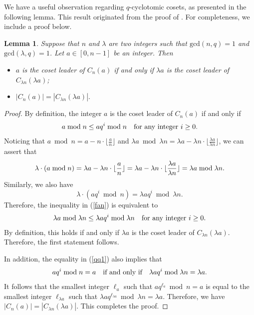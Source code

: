 \documentclass[journal,onecolumn]{IEEEtran}
\newtheorem{lemma}{Lemma}
\begin{document}
We have a useful observation regarding 
$q$-cyclotomic cosets, as presented in the following lemma. This result originated  from  the proof of \cite[Lemma 6]{ZSK2019}. For completeness, we include a proof below.    
\begin{lemma}\label{cos2}
Suppose that  $n$ and $\lambda$ are  two  integers such that  $\mathrm{gcd}(n,q)=1
 $  and  $\mathrm{gcd}(\lambda,q)=1$. Let $a\in [0,n-1]$ be  an integer. Then  
 \begin{itemize}
     \item  $a$ is the   coset leader of  $C_{n}(a)$ if and only if  $\lambda a$  is the coset leader of  $C_{\lambda n}(\lambda a)$;
     \item $|C_{n}(a)|=|C_{\lambda n}(\lambda a)|.$
 \end{itemize}
\end{lemma} 
\begin{proof}
    By definition, the integer $a$ is the coset leader of $C_{n}(a)$ if and only if 
    \begin{equation}\label{fan}
        a \bmod n  \leq aq^i \bmod  n \quad \hbox{for any integer  } i\geq 0. 
    \end{equation}
Noticing that 
    $a \bmod n = a- n\cdot \lfloor \displaystyle\frac{ a}{ n } \rfloor $ and $\lambda a  \bmod \lambda n=\lambda a - \lambda n \cdot \lfloor \displaystyle\frac{\lambda a}{\lambda  n}\rfloor$, 
we can assert that 
\begin{equation}\notag
    \lambda \cdot (a \bmod n) =  \lambda a -  \lambda n \cdot \lfloor \displaystyle\frac{  a}{ n }\rfloor = \lambda a -  \lambda n \cdot \lfloor \displaystyle\frac{ \lambda a}{\lambda n }\rfloor = \lambda a \bmod \lambda n.
\end{equation}
Similarly, we also have 
\begin{equation}\label{qq1}
   \lambda \cdot (aq^i \bmod n) = \lambda a q^i  \bmod \lambda n. 
\end{equation}
Therefore, the inequality in (\ref{fan}) is equivalent to 
\begin{equation}\notag
    \lambda a  \bmod   \lambda n \leq \lambda a q^i  \bmod \lambda n \quad \hbox{for any integer  } i\geq 0. 
\end{equation}
By definition, this  holds if and only if  $\lambda a $ is the coset leader of $C_{\lambda n}(\lambda a)$. Therefore, the first statement follows. 

In addition, the equality in  (\ref{qq1}) also implies that 
\begin{equation}\notag
    aq^{i} \bmod n =a \quad \hbox{if and only if} \quad  \lambda a q^i  \bmod  \lambda n =\lambda a.
\end{equation} 
It follows that  the smallest integer $\ell_a$ such that $aq^{\ell_a} \bmod n = a$ is equal to the smallest integer $\ell_{\lambda a} $ such that $\lambda aq^{\ell_{\lambda a}} \bmod \lambda n=\lambda a$. Therefore, we have $|C_{n}(a)|=|C_{ \lambda n}(\lambda a)|.$ This completes the proof. 
\end{proof}
\end{document}
